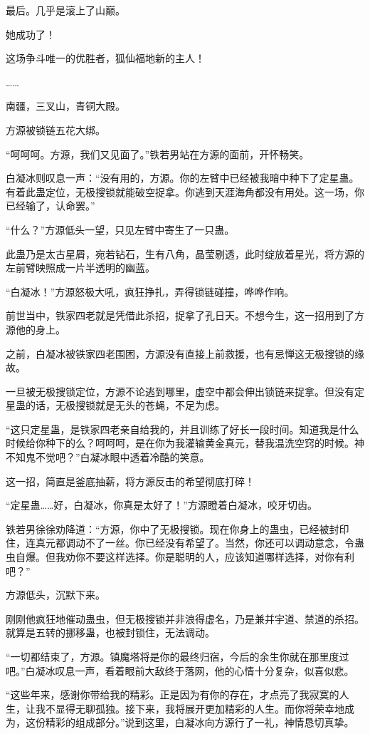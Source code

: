 \begin{this_body}
最后。几乎是滚上了山巅。

她成功了！

这场争斗唯一的优胜者，狐仙福地新的主人！

……

南疆，三叉山，青铜大殿。

方源被锁链五花大绑。

“呵呵呵。方源，我们又见面了。”铁若男站在方源的面前，开怀畅笑。

白凝冰则叹息一声：“没有用的，方源。你的左臂中已经被我暗中种下了定星蛊。有着此蛊定位，无极搜锁就能破空捉拿。你逃到天涯海角都没有用处。这一场，你已经输了，认命罢。”

“什么？”方源低头一望，只见左臂中寄生了一只蛊。

此蛊乃是太古星屑，宛若钻石，生有八角，晶莹剔透，此时绽放着星光，将方源的左前臂映照成一片半透明的幽蓝。

“白凝冰！”方源怒极大吼，疯狂挣扎，弄得锁链碰撞，哗哗作响。

前世当中，铁家四老就是凭借此杀招，捉拿了孔日天。不想今生，这一招用到了方源他的身上。

之前，白凝冰被铁家四老围困，方源没有直接上前救援，也有忌惮这无极搜锁的缘故。

一旦被无极搜锁定位，方源不论逃到哪里，虚空中都会伸出锁链来捉拿。但没有定星蛊的话，无极搜锁就是无头的苍蝇，不足为虑。

“这只定星蛊，是铁家四老亲自给我的，并且训练了好长一段时间。知道我是什么时候给你种下的么？呵呵呵，是在你为我灌输黄金真元，替我温洗空窍的时候。神不知鬼不觉吧？”白凝冰眼中透着冷酷的笑意。

这一招，简直是釜底抽薪，将方源反击的希望彻底打碎！

“定星蛊……好，白凝冰，你真是太好了！”方源瞪着白凝冰，咬牙切齿。

铁若男徐徐劝降道：“方源，你中了无极搜锁。现在你身上的蛊虫，已经被封印住，连真元都调动不了一丝。你已经没有希望了。当然，你还可以调动意念，令蛊虫自爆。但我劝你不要这样选择。你是聪明的人，应该知道哪样选择，对你有利吧？”

方源低头，沉默下来。

刚刚他疯狂地催动蛊虫，但无极搜锁并非浪得虚名，乃是兼并宇道、禁道的杀招。就算是五转的挪移蛊，也被封锁住，无法调动。

“一切都结束了，方源。镇魔塔将是你的最终归宿，今后的余生你就在那里度过吧。”白凝冰叹息一声，看着眼前大敌终于落网，他的心情十分复杂，似喜似悲。

“这些年来，感谢你带给我的精彩。正是因为有你的存在，才点亮了我寂寞的人生，让我不显得无聊孤独。接下来，我将展开更加精彩的人生。而你将荣幸地成为，这份精彩的组成部分。”说到这里，白凝冰向方源行了一礼，神情恳切真挚。

\end{this_body}

